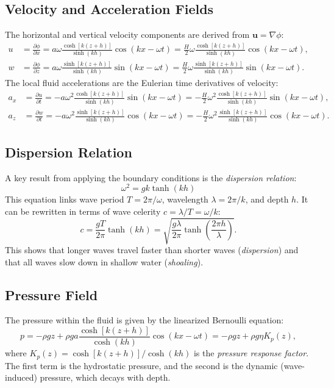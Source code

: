 \documentclass[11pt,letterpaper]{article}
\begin{document}
    \subsection{Velocity and Acceleration Fields}
    The horizontal and vertical velocity components are derived from $\mathbf{u} = \nabla \phi$:
    \begin{align}
        u &= \frac{\partial \phi}{\partial x} = a\omega \frac{\cosh[k(z+h)]}{\sinh(kh)} \cos(kx - \omega t) = \frac{H}{2}\omega \frac{\cosh[k(z+h)]}{\sinh(kh)} \cos(kx - \omega t), \\
        w &= \frac{\partial \phi}{\partial z} = a\omega \frac{\sinh[k(z+h)]}{\sinh(kh)} \sin(kx - \omega t) = \frac{H}{2}\omega \frac{\sinh[k(z+h)]}{\sinh(kh)} \sin(kx - \omega t).
    \end{align}
    The local fluid accelerations are the Eulerian time derivatives of velocity:
    \begin{align}
        a_x &= \frac{\partial u}{\partial t} = -a\omega^2 \frac{\cosh[k(z+h)]}{\sinh(kh)} \sin(kx - \omega t) = -\frac{H}{2}\omega^2 \frac{\cosh[k(z+h)]}{\sinh(kh)} \sin(kx - \omega t), \\
        a_z &= \frac{\partial w}{\partial t} = -a\omega^2 \frac{\sinh[k(z+h)]}{\sinh(kh)} \cos(kx - \omega t) = -\frac{H}{2}\omega^2 \frac{\sinh[k(z+h)]}{\sinh(kh)} \cos(kx - \omega t).
    \end{align}


    \subsection{Dispersion Relation}
    A key result from applying the boundary conditions is the \emph{dispersion relation}:
    \begin{equation}
        \omega^2 = gk \tanh(kh)
        \label{eq:dispersion}
    \end{equation}
    This equation links wave period $T = 2\pi/\omega$, wavelength $\lambda = 2\pi/k$, and depth $h$. It can be rewritten in terms of wave celerity $c = \lambda/T = \omega/k$:
    \begin{equation}
        c = \frac{gT}{2\pi} \tanh(kh) = \sqrt{\frac{g\lambda}{2\pi} \tanh\left(\frac{2\pi h}{\lambda}\right)}.
    \end{equation}
    This shows that longer waves travel faster than shorter waves (\emph{dispersion}) and that all waves slow down in shallow water (\emph{shoaling}).

    \subsection{Pressure Field}
    The pressure within the fluid is given by the linearized Bernoulli equation:
    \begin{equation}
        p = -\rho g z + \rho g a \frac{\cosh[k(z+h)]}{\cosh(kh)} \cos(kx - \omega t) = -\rho g z + \rho g \eta K_p(z),
        \label{eq:airypressure}
    \end{equation}
    where $K_p(z) = \cosh[k(z+h)] / \cosh(kh)$ is the \emph{pressure response factor}. The first term is the hydrostatic pressure, and the second is the dynamic (wave-induced) pressure, which decays with depth.
\end{document}
